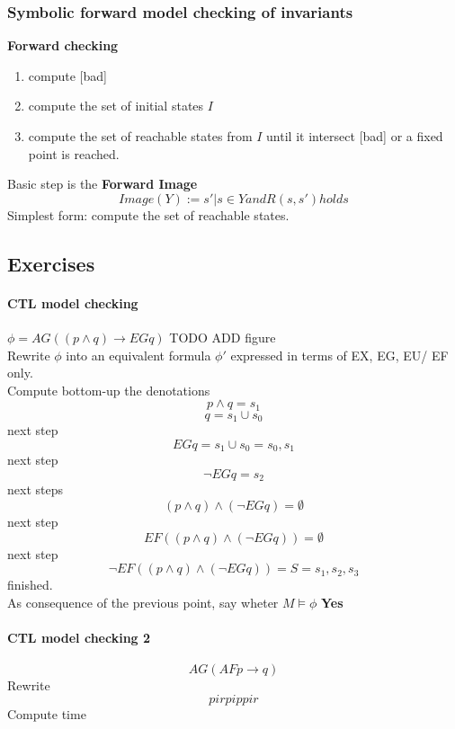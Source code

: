 \documentclass[11pt]{article}
\begin{document}
\subsubsection{Symbolic forward model checking of invariants} %
\label{ssub:symbolic_forward_model_checking_of_invariants}
\textbf{Forward checking}
\begin{enumerate}
	\item compute [bad]
	\item compute the set of initial states $I$
	\item compute the set of reachable states from $I$ until it intersect [bad] or a fixed point is reached.
\end{enumerate}
Basic step is the \textbf{Forward Image}\[
	Image(Y) := {s' | s \in Y and R(s,s') holds}
\]
Simplest form: compute the set of reachable states.

\subsection{Exercises} %
\label{sub:exercises}
\paragraph{CTL model checking} %
\label{par:ctl_model_checking}
$\phi = AG ((p \land q) \rightarrow EG q)$
TODO ADD figure\\
Rewrite $\phi$ into an equivalent formula $\phi'$ expressed in terms of EX, EG, EU/ EF only.\\
Compute bottom-up the denotations
\[
	p \land q = s_1
\]\[
	q = s_1 \cup s_0
\]
next step
\[
	EG q = s_1 \cup s_0 = {s_0, s_1} 
\]
next step
\[
	\lnot EG q = {s_2} 
\]
next steps
\[
	(p \land q) \land (\lnot EG q) = \emptyset
\]
next step 
\[
	EF((p \land q) \land (\lnot EG q)) = \emptyset
\]
next step 
\[
	\lnot EF((p \land q) \land (\lnot EG q)) = S = s_1, s_2, s_3
\]
finished.\\
As consequence of the previous point, say wheter $M \models \phi$ \textbf{Yes}


\paragraph{CTL model checking 2} %
\label{par:ctl_model_checking_2}
\[
	AG(AF p \rightarrow q)
\]
Rewrite
\[
	pirpippir
\]
Compute time
\end{document}
